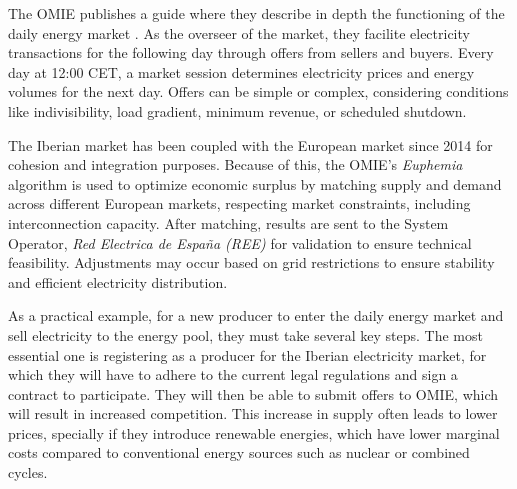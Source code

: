 \documentclass[12pt]{report} %
\begin{document}

The OMIE publishes a guide where they describe in depth the functioning of the daily energy market \cite{OMIE_MercadoDiario}. As the overseer of the market, they facilite electricity transactions for the following day through offers from sellers and buyers. Every day at 12:00 CET, a market session determines electricity prices and energy volumes for the next day. Offers can be simple or complex, considering conditions like indivisibility, load gradient, minimum revenue, or scheduled shutdown.

The Iberian market has been coupled with the European market since 2014 for cohesion and integration purposes. Because of this, the OMIE's \textit{Euphemia} algorithm is used to optimize economic surplus by matching supply and demand across different European markets, respecting market constraints, including interconnection capacity. After matching, results are sent to the System Operator, \textit{Red Electrica de España (REE)} for validation to ensure technical feasibility. Adjustments may occur based on grid restrictions to ensure stability and efficient electricity distribution.

As a practical example, for a new producer to enter the daily energy market and sell electricity to the energy pool, they must take several key steps. The most essential one is registering as a producer for the Iberian electricity market, for which they will have to adhere to the current legal regulations and sign a contract to participate. They will then be able to submit offers to OMIE, which will result in increased competition. This increase in supply often leads to lower prices, specially if they introduce renewable energies, which have lower marginal costs compared to conventional energy sources such as nuclear or combined cycles.
\end{document}
